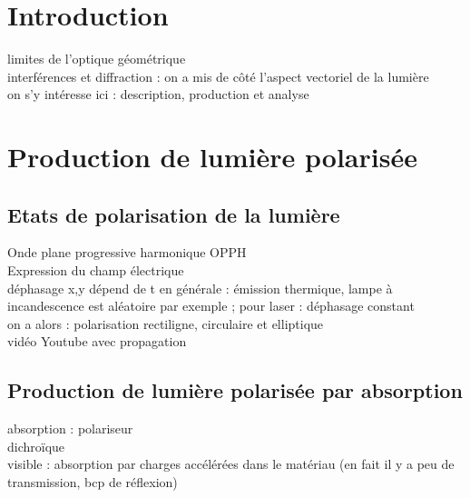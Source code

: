 


\biblio{}

\section*{Introduction}
limites de l'optique géométrique \\
interférences et diffraction : on a mis de côté l'aspect vectoriel de la lumière \\
on s'y intéresse ici : description, production et analyse \\


\section{Production de lumière polarisée}
\subsection{Etats de polarisation de la lumière}
Onde plane progressive harmonique OPPH \\
Expression du champ électrique \\
déphasage x,y dépend de t en générale : émission thermique, lampe à incandescence est aléatoire par exemple ; pour laser : déphasage constant \\
on a alors : polarisation rectiligne, circulaire et elliptique \\
vidéo Youtube avec propagation \\

\subsection{Production de lumière polarisée par absorption}
absorption : polariseur \\
dichroïque \\
visible : absorption par charges accélérées dans le matériau (en fait il y a peu de transmission, bcp de réflexion) \\


